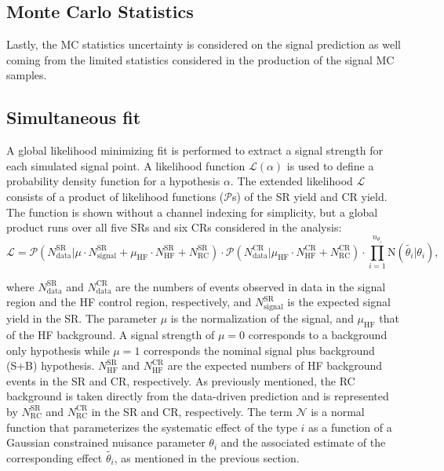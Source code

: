 \subsection*{Monte Carlo Statistics}
Lastly, the MC statistics uncertainty is considered on the signal prediction as well coming from the limited statistics considered in the production of the signal MC samples.

\subsection{Simultaneous fit}
A global likelihood minimizing fit is performed to extract a signal strength for each simulated signal point. A likelihood function $\mathcal{L}(\alpha)$ is used to define a probability density function for a hypothesis $\alpha$. The extended likelihood $\mathcal{L}$ consists of a product of likelihood functions ($\mathcal{P}$s) of the SR yield and CR yield. The function is shown without a channel indexing for simplicity, but a global product runs over all five SRs and six CRs considered in the analysis:
\begin{equation}
\label{eqn:likelihood}
    \mathcal{L} = \mathcal{P}( N_{\mathrm{data}}^{\mathrm{SR}}| \mu \cdot N_{\mathrm{signal}}^{\mathrm{SR}} +  
    \mu_{\mathrm{HF}}  \cdot N_{\mathrm{HF}}^{\mathrm{SR}} + N_{\mathrm{RC}}^{\mathrm{SR}} ) \cdot 
    \mathcal{P}(N_{\mathrm{data}}^{\mathrm{CR}} | \mu_{\mathrm{HF}}\cdot N_{\mathrm{HF}}^{\mathrm{CR}} + N_{\mathrm{RC}}^{\mathrm{CR}}) \cdot                                                    \prod_{i=1}^{n_{\theta_i}}\mathrm{N}(\tilde{\theta_i}| \theta_i),
\end{equation}

where $N_{\mathrm{data}}^{\mathrm{SR}}$ and $N_{\mathrm{data}}^{\mathrm{CR}}$ are the numbers of events observed in data in the signal region and the HF control region, respectively, and $N_{\mathrm{signal}}^{\mathrm{SR}}$ is the expected signal yield in the SR. The parameter $\mu$ is the normalization of the signal, and $\mu_{\mathrm{HF}}$ that of the HF background. A signal strength of $\mu=0$ corresponds to a background only hypothesis while $\mu=1$ corresponds the nominal signal plus background (S+B) hypothesis. $N_{\mathrm{HF}}^{\mathrm{SR}}$ and $N_{\mathrm{HF}}^{\mathrm{CR}}$ are the expected numbers of HF background events in the SR and CR, respectively. As previously mentioned, the RC background is taken directly from the data-driven prediction and is represented by $N_{\mathrm{RC}}^{\mathrm{SR}}$ and $N_{\mathrm{RC}}^{\mathrm{CR}}$ in the SR and CR, respectively.  The term $\mathcal{N}$ is a normal function that parameterizes the systematic effect of the type $i$ as a function of a Gaussian constrained nuisance parameter $\theta_i$ and the associated estimate of the corresponding effect $\tilde{\theta_i}$, as mentioned in the previous section. 

